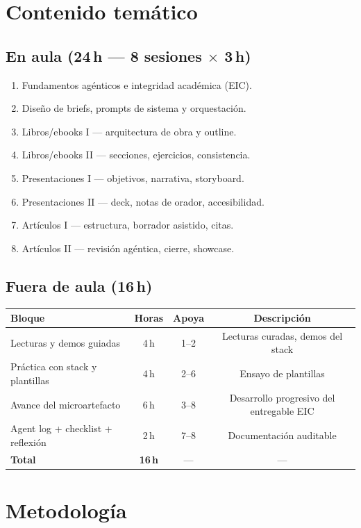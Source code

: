 \section{Contenido temático}

\subsection{En aula (24\,h --- 8 sesiones $\times$ 3\,h)}

\begin{enumerate}
\item Fundamentos agénticos e integridad académica (EIC).
\item Diseño de briefs, prompts de sistema y orquestación.
\item Libros/ebooks I --- arquitectura de obra y outline.
\item Libros/ebooks II --- secciones, ejercicios, consistencia.
\item Presentaciones I --- objetivos, narrativa, storyboard.
\item Presentaciones II --- deck, notas de orador, accesibilidad.
\item Artículos I --- estructura, borrador asistido, citas.
\item Artículos II --- revisión agéntica, cierre, showcase.
\end{enumerate}

\subsection{Fuera de aula (16\,h)}

\begin{tabularx}{\textwidth}{@{}Xccc@{}}
\toprule
Bloque & Horas & Apoya & Descripción \\
\midrule
Lecturas y demos guiadas & 4\,h & 1--2 & Lecturas curadas, demos del stack \\
Práctica con stack y plantillas & 4\,h & 2--6 & Ensayo de plantillas \\
Avance del microartefacto & 6\,h & 3--8 & Desarrollo progresivo del entregable EIC \\
Agent log + checklist + reflexión & 2\,h & 7--8 & Documentación auditable \\
\textbf{Total} & \textbf{16\,h} & --- & --- \\
\bottomrule
\end{tabularx}

\section{Metodología}

